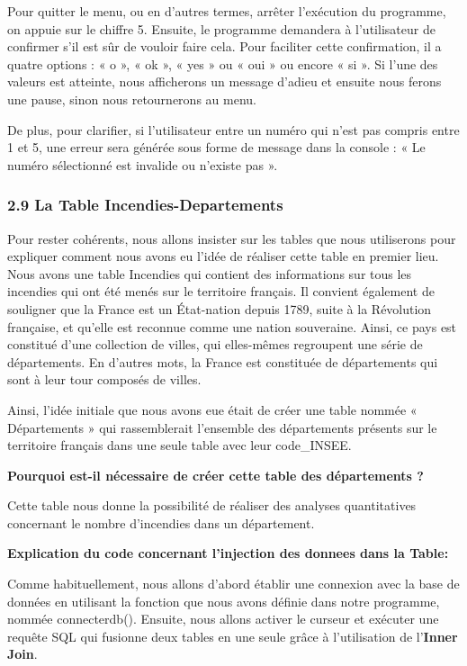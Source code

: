 \documentclass[
]{article}
\begin{document}
Pour quitter le menu, ou en d'autres termes, arrêter l'exécution du
programme, on appuie sur le chiffre 5. Ensuite, le programme demandera à
l'utilisateur de confirmer s'il est sûr de vouloir faire cela. Pour
faciliter cette confirmation, il a quatre options : « o », « ok », « yes
» ou « oui » ou encore « si ». Si l'une des valeurs est atteinte, nous
afficherons un message d'adieu et ensuite nous ferons une pause, sinon
nous retournerons au menu.

De plus, pour clarifier, si l'utilisateur entre un numéro qui n'est pas
compris entre 1 et 5, une erreur sera générée sous forme de message dans
la console : « Le numéro sélectionné est invalide ou n'existe pas ».

\subsubsection{2.9 La Table
Incendies-Departements}\label{la-table-incendies-departements}

Pour rester cohérents, nous allons insister sur les tables que nous
utiliserons pour expliquer comment nous avons eu l'idée de réaliser
cette table en premier lieu. Nous avons une table Incendies qui contient
des informations sur tous les incendies qui ont été menés sur le
territoire français. Il convient également de souligner que la France
est un État-nation depuis 1789, suite à la Révolution française, et
qu'elle est reconnue comme une nation souveraine. Ainsi, ce pays est
constitué d'une collection de villes, qui elles-mêmes regroupent une
série de départements. En d'autres mots, la France est constituée de
départements qui sont à leur tour composés de villes.

Ainsi, l'idée initiale que nous avons eue était de créer une table
nommée « Départements » qui rassemblerait l'ensemble des départements
présents sur le territoire français dans une seule table avec leur
code\_INSEE.

\textbf{Pourquoi est-il nécessaire de créer cette table des départements
?}

Cette table nous donne la possibilité de réaliser des analyses
quantitatives concernant le nombre d'incendies dans un département.

\textbf{Explication du code concernant l'injection des donnees dans la
Table:}

Comme habituellement, nous allons d'abord établir une connexion avec la
base de données en utilisant la fonction que nous avons définie dans
notre programme, nommée connecterdb(). Ensuite, nous allons activer le
curseur et exécuter une requête SQL qui fusionne deux tables en une
seule grâce à l'utilisation de l'\textbf{Inner Join}.
\end{document}
